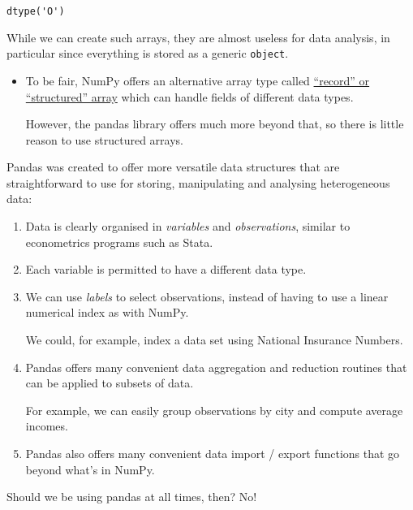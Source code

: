 \documentclass{scrartcl}
\makeatletter
\newcommand{\boxspacing}{\kern\kvtcb@left@rule\kern\kvtcb@boxsep}
\newcommand{\prompt}[4]{
        {\ttfamily\llap{{\color{#2}[#3]:\hspace{3pt}#4}}\vspace{-\baselineskip}}
    }
\makeatother
\begin{document}
            \begin{tcolorbox}[breakable, size=fbox, boxrule=.5pt, pad at break*=1mm, opacityfill=0]
\prompt{Out}{outcolor}{2}{\boxspacing}
\begin{Verbatim}[commandchars=\\\{\}]
dtype('O')
\end{Verbatim}
\end{tcolorbox}
        
    While we can create such arrays, they are almost useless for data
analysis, in particular since everything is stored as a generic
\texttt{object}.

\begin{itemize}
\item
  To be fair, NumPy offers an alternative array type called
  \href{https://numpy.org/doc/stable/user/basics.rec.html}{``record'' or
  ``structured'' array} which can handle fields of different data types.

  However, the pandas library offers much more beyond that, so there is
  little reason to use structured arrays.
\end{itemize}

Pandas was created to offer more versatile data structures that are
straightforward to use for storing, manipulating and analysing
heterogeneous data:

\begin{enumerate}
\def\labelenumi{\arabic{enumi}.}
\item
  Data is clearly organised in \emph{variables} and \emph{observations},
  similar to econometrics programs such as Stata.
\item
  Each variable is permitted to have a different data type.
\item
  We can use \emph{labels} to select observations, instead of having to
  use a linear numerical index as with NumPy.

  We could, for example, index a data set using National Insurance
  Numbers.
\item
  Pandas offers many convenient data aggregation and reduction routines
  that can be applied to subsets of data.

  For example, we can easily group observations by city and compute
  average incomes.
\item
  Pandas also offers many convenient data import / export functions that
  go beyond what's in NumPy.
\end{enumerate}

Should we be using pandas at all times, then? No!
\end{document}
